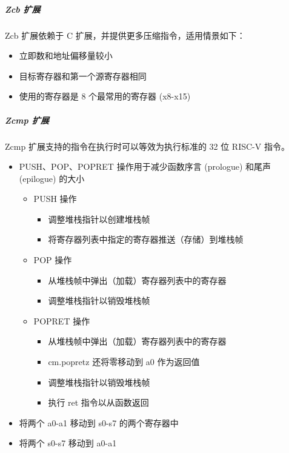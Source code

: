 \documentclass[main\_\_CN.tex]{subfiles}
\begin{document}
\subparagraph{Zcb 扩展}

Zcb 扩展依赖于 C 扩展，并提供更多压缩指令，适用情景如下：

\begin{itemize}
    \item 立即数和地址偏移量较小
    \item 目标寄存器和第一个源寄存器相同
    \item 使用的寄存器是 8 个最常用的寄存器 (x8-x15)
\end{itemize}

\subparagraph{Zcmp 扩展}

Zcmp 扩展支持的指令在执行时可以等效为执行标准的 32 位 RISC-V 指令。

\begin{itemize}
    \item PUSH、POP、POPRET 操作用于减少函数序言 (prologue) 和尾声 (epilogue) 的大小
        \begin{itemize}
            \item PUSH 操作
                \begin{itemize}
                    \item 调整堆栈指针以创建堆栈帧
                    \item 将寄存器列表中指定的寄存器推送（存储）到堆栈帧
                \end{itemize}
            \item POP 操作
                \begin{itemize}
                    \item 从堆栈帧中弹出（加载）寄存器列表中的寄存器
                    \item 调整堆栈指针以销毁堆栈帧
                \end{itemize}
            \item POPRET 操作
                \begin{itemize}
                    \item 从堆栈帧中弹出（加载）寄存器列表中的寄存器
                    \item cm.popretz 还将零移动到 a0 作为返回值
                    \item 调整堆栈指针以销毁堆栈帧
                    \item 执行 ret 指令以从函数返回
                \end{itemize}
        \end{itemize}
    \item 将两个 a0-a1 移动到 s0-s7 的两个寄存器中
    \item 将两个 s0-s7 移动到 a0-a1
\end{itemize}
\end{document}
